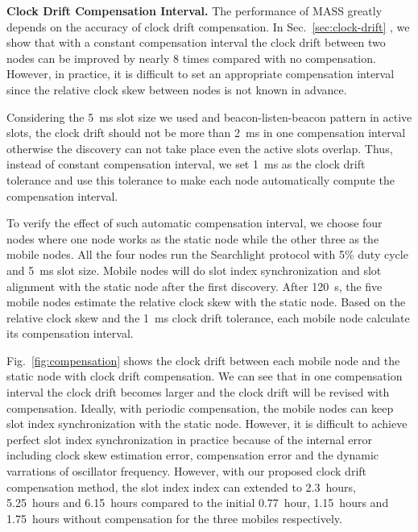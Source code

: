\documentclass[twoside,twocolumn]{article}
\begin{document}
{\bf Clock Drift Compensation Interval.} The performance of MASS greatly
depends on the accuracy of clock drift compensation. In Sec.~\ref{sec:clock-drift}
, we show that with a constant compensation interval the clock drift
between two nodes can be improved by nearly 8 times compared with no 
compensation. However, in practice, it is difficult to set an appropriate
compensation interval since the relative clock skew between nodes is
not known in advance. 

Considering the 5~ms slot size we used and beacon-listen-beacon pattern 
in active slots, the clock drift should not be more than 2~ms in one
compensation interval otherwise the discovery can not take place even
the active slots overlap. Thus, instead of constant compensation interval,
we set 1~ms as the clock drift tolerance and use this tolerance to make
each node automatically compute the compensation interval. 

To verify the effect of such automatic compensation interval, we choose 
four nodes where one node works as the static node while the other three 
as the mobile nodes. All the four nodes run the Searchlight protocol with 
5\% duty cycle and 5~ms slot size. Mobile nodes will do slot index 
synchronization and slot alignment with the static node after the first 
discovery. After 120~s, the five mobile nodes estimate the relative clock
skew with the static node. Based on the relative clock skew and the 1~ms
clock drift tolerance, each mobile node calculate its compensation interval.

Fig.~\ref{fig:compensation} shows the clock drift between each mobile node
and the static node with clock drift compensation. We can see that in one
compensation interval the clock drift becomes larger and the clock drift
will be revised with compensation. Ideally, with periodic compensation, the
mobile nodes can keep slot index synchronization with the static node.
However, it is difficult to achieve perfect slot index synchronization in
practice because of the internal error including clock skew estimation error,
compensation error and the dynamic varrations of oscillator frequency.
However, with our proposed clock drift compensation method, the slot index
index can extended to 2.3~hours, 5.25~hours and 6.15~hours compared to the
initial 0.77~hour, 1.15~hours and 1.75~hours without compensation for the
three mobiles respectively.
\end{document}
